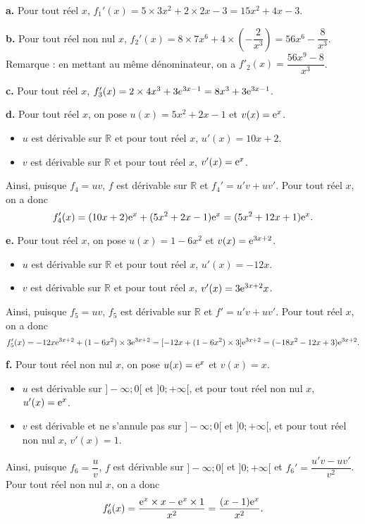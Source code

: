 \documentclass[11pt,fleqn, openany]{book} %
\begin{document}
\begin{solution} \textbf{a.}  Pour tout réel $x$, $f_1'(x)=5\times 3x^2 + 2 \times 2x -3 = 15x^2+4x-3$.

\textbf{b.} Pour tout réel non nul $x$, $f_2'(x)=8\times 7x^6 + 4 \times \left(-\dfrac{2}{x^3}\right)=56x^6-\dfrac{8}{x^3}$.\\
Remarque : en mettant au même dénominateur, on a $f'_2(x)=\dfrac{56x^9-8}{x^3}$.

\textbf{c.} Pour tout réel $x$, $f_3'(x)=2\times 4x^3+3e^{3x-1}=8x^3+3\mathrm{e}^{3x-1}$.

\textbf{d.} Pour tout réel $x$, on pose $u(x)=5x^2+2x-1$ et $v(x)=\mathrm{e}^x$.
\begin{itemize}
\item $u$ est dérivable sur $\mathbb{R}$ et pour tout réel $x$, $u'(x)=10x+2$.
\item $v$ est dérivable sur $\mathbb{R}$ et pour tout réel $x$, $v'(x)=\mathrm{e}^x$.
\end{itemize}
Ainsi, puisque $f_4=uv$, $f$ est dérivable sur $\mathbb{R}$ et $f_4'=u'v+uv'$. Pour tout réel $x$, on a donc
\[ f_4'(x)=(10x+2)\mathrm{e}^x+(5x^2+2x-1)\mathrm{e}^x=(5x^2+12x+1)\mathrm{e}^x.\]

\textbf{e.} Pour tout réel $x$, on pose $u(x)=1-6x^2$ et $v(x)=\mathrm{e}^{3x+2}$.
\begin{itemize}
\item $u$ est dérivable sur $\mathbb{R}$ et pour tout réel $x$, $u'(x)=-12x$.
\item $v$ est dérivable sur $\mathbb{R}$ et pour tout réel $x$, $v'(x)=3\mathrm{e}^{3x+2}x$.
\end{itemize}
Ainsi, puisque $f_5=uv$, $f_5$ est dérivable sur $\mathbb{R}$ et $f'=u'v+uv'$. Pour tout réel $x$, on a donc
\[ f_5'(x)=-12x\mathrm{e}^{3x+2}+(1-6x^2)\times 3\mathrm{e}^{3x+2}=[-12x+(1-6x^2)\times 3] \mathrm{e}^{3x+2}=(-18x^2-12x+3)\mathrm{e}^{3x+2}.\]

\textbf{f.} Pour tout réel non nul $x$, on pose $u(x)=\mathrm{e}^x$ et $v(x)=x$.
\begin{itemize}
\item $u$ est dérivable sur $]-\infty;0[$ et $]0;+\infty[$, et pour tout réel non nul $x$, $u'(x)=\mathrm{e}^x$.
\item $v$ est dérivable et ne s'annule pas sur $]-\infty;0[$ et $]0;+\infty[$, et pour tout réel non nul $x$, $v'(x)=1$.
\end{itemize}
Ainsi, puisque $f_6=\dfrac{u}{v}$, $f$ est dérivable sur $]-\infty;0[$ et $]0;+\infty[$ et $f_6'=\dfrac{u'v-uv'}{v^2}$. Pour tout réel non nul $x$, on a donc
\[ f_6'(x)=\dfrac{\mathrm{e}^x\times x-\mathrm{e}^x\times 1}{x^2}=\dfrac{(x-1)\mathrm{e}^x}{x^2}.\]


\end{solution}
\end{document}
